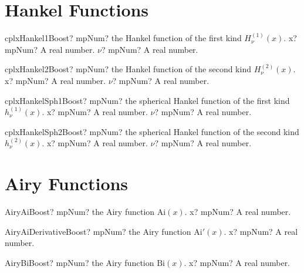 \documentclass[12pt,a4paper,openany]{book}
\begin{document}
\section{Hankel Functions}

\begin{mpFunctionsExtract}
\mpFunctionTwo
{cplxHankel1Boost? mpNum? the Hankel function of the first kind $H_{\nu}^{(1)}(x)$.}
{x? mpNum? A real number.}
{$\nu$? mpNum? A real number.}
\end{mpFunctionsExtract}

\begin{mpFunctionsExtract}
\mpFunctionTwo
{cplxHankel2Boost? mpNum? the Hankel function of the second kind $H_{\nu}^{(2)}(x)$.}
{x? mpNum? A real number.}
{$\nu$? mpNum? A real number.}
\end{mpFunctionsExtract}

\begin{mpFunctionsExtract}
\mpFunctionTwo
{cplxHankelSph1Boost? mpNum? the spherical Hankel function of the first kind $h_{\nu}^{(1)}(x)$.}
{x? mpNum? A real number.}
{$\nu$? mpNum? A real number.}
\end{mpFunctionsExtract}

\begin{mpFunctionsExtract}
\mpFunctionTwo
{cplxHankelSph2Boost? mpNum? the spherical Hankel function of the second kind $h_{\nu}^{(2)}(x)$.}
{x? mpNum? A real number.}
{$\nu$? mpNum? A real number.}
\end{mpFunctionsExtract}

\section{Airy Functions}

\begin{mpFunctionsExtract}
\mpFunctionOne
{AiryAiBoost? mpNum? the Airy function $\text{Ai}(x)$.}
{x? mpNum? A real number.}
\end{mpFunctionsExtract}

\begin{mpFunctionsExtract}
\mpFunctionOne
{AiryAiDerivativeBoost? mpNum? the Airy function $\text{Ai}'(x)$.}
{x? mpNum? A real number.}
\end{mpFunctionsExtract}

\begin{mpFunctionsExtract}
\mpFunctionOne
{AiryBiBoost? mpNum? the Airy function $\text{Bi}(x)$.}
{x? mpNum? A real number.}
\end{mpFunctionsExtract}
\end{document}
